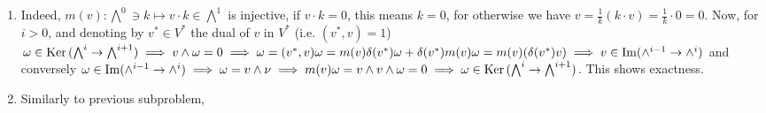 \documentclass[8pt,fleqn]{article} %
\newcommand{\Ker}{\mbox{\normalfont Ker\,}}
\begin{document}
\begin{enumerate}[label=\bfseries Problem \arabic*.]
\begin{enumerate}[label=(\arabic*).]
\item Indeed, $m(v):\bigwedge^0\ni k\mapsto v\cdot k\in\bigwedge^1$ is injective, if $v\cdot k=0$, this means $k=0$, for otherwise we have
$v=\frac{1}{k}(k\cdot v)=\frac{1}{k}\cdot 0=0$. Now, for $i>0$, and denoting by $v^*\in V^*$ the dual of $v$ in $V^*$ (i.e. $(v^*,v)=1$)
$\omega\in\Ker(\bigwedge^i\to\bigwedge^{i+1})\implies v\wedge\omega=0\implies \omega=(v^*,v)\omega=m(v)\delta(v^*)\omega+\delta(v^*)m(v)\omega=
m(v)(\delta(v^*)v)\implies v\in\Im(\wedge^{i-1}\to\wedge^i)$ and conversely $\omega\in\Im(\wedge^{i-1}\to\wedge^i)\implies\omega=v\wedge\nu\implies
m(v)\omega=v\wedge v\wedge\omega=0\implies\omega\in\Ker(\bigwedge^i\to\bigwedge^{i+1})$. This shows exactness.
\item Similarly to previous subproblem, 
		\end{enumerate}
\end{enumerate}
\end{document}
